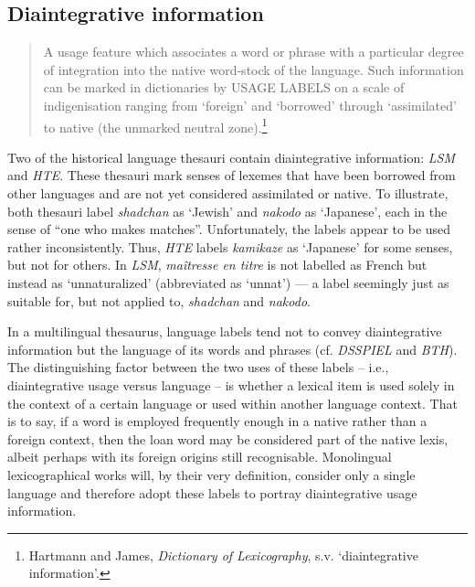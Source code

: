 \subsection*{Diaintegrative information}
\begin{quotation} \noindent
A usage feature which associates a word or phrase with a particular degree of integration into the native word-stock of the language. Such information can be marked in dictionaries by USAGE LABELS on a scale of indigenisation ranging from `foreign' and `borrowed' through `assimilated' to native (the unmarked neutral zone).\footnote{Hartmann and James, \textit{Dictionary of Lexicography}, s.v. `diaintegrative information'.}
\end{quotation}
Two of the historical language thesauri contain diaintegrative information: \textit{LSM} and \textit{HTE}. These thesauri mark senses of lexemes that have been borrowed from other languages and are not yet considered assimilated or native. To illustrate, both thesauri label \textit{shadchan} as `Jewish' and \textit{nakodo} as `Japanese', each in the sense of ``one who makes matches''. Unfortunately, the labels appear to be used rather inconsistently. Thus, \textit{HTE} labels \textit{kamikaze} as `Japanese' for some senses, but not for others. In \textit{LSM}, \textit{maîtresse en titre} is not labelled as French but instead as `unnaturalized' (abbreviated as `unnat') --- a label seemingly just as suitable for, but not applied to, \textit{shadchan} and \textit{nakodo}.

In a multilingual thesaurus, language labels tend not to convey diaintegrative information but the language of its words and phrases (cf. \textit{DSSPIEL} and \textit{BTH}). The distinguishing factor between the two uses of these labels -- i.e., diaintegrative usage versus language -- is whether a lexical item is used solely in the context of a certain language or used within another language context. That is to say, if a word is employed frequently enough in a native rather than a foreign context, then the loan word may be considered part of the native lexis, albeit perhaps with its foreign origins still recognisable. Monolingual lexicographical works will, by their very definition, consider only a single language and therefore adopt these labels to portray diaintegrative usage information.

